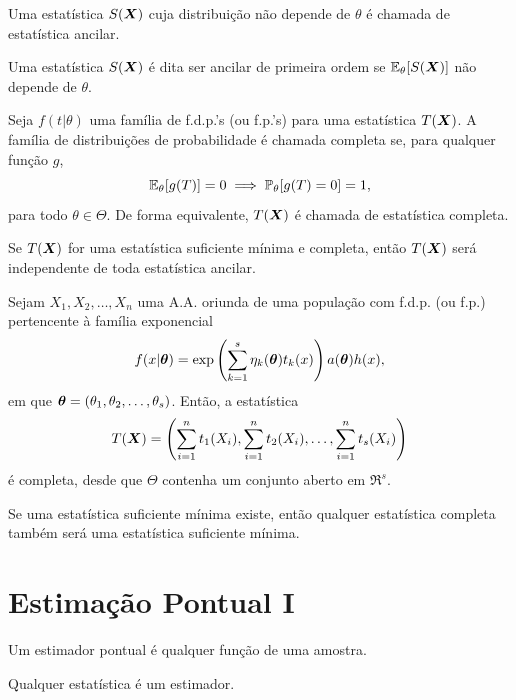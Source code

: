 \begin{definition}
	Uma estatística $S(\bm{X})$ cuja distribuição não depende de $\theta$ é chamada de estatística ancilar.
	
	\begin{note}
		Uma estatística $S(\bm{X})$ é dita ser ancilar de primeira ordem se $\operatorname{\mathbb{E}}_\theta[S(\bm{X})]$ não depende de $\theta$.
	\end{note}
\end{definition}

\begin{definition}
	Seja $f(t | \theta)$ uma família de f.d.p.'s (ou f.p.'s) para uma estatística $T(\bm{X})$. A família de distribuições de probabilidade é chamada completa se, para qualquer função $g$,
	\[
	\operatorname{\mathbb{E}}_\theta[g(T)] = 0 \implies \mathbb{P}_\theta[g(T) = 0] = 1,
	\]
	para todo $\theta \in \Theta$. De forma equivalente, $T(\bm{X})$ é chamada de estatística completa.
\end{definition}

\begin{theorem}[Basu]
	Se $T(\bm{X})$ for uma estatística suficiente mínima e completa, então $T(\bm{X})$ será independente de toda estatística ancilar.
\end{theorem}

\begin{theorem}
	Sejam $X_1, X_2, \ldots, X_n$ uma A.A. oriunda de uma população com f.d.p. (ou f.p.) pertencente à família exponencial
	\[
		f(x | \bm{\theta}) = \exp\left(\sum_{k=1}^{s} \eta_k(\bm{\theta})t_k(x)\right) a(\bm{\theta})h(x),
	\]
	em que $\bm{\theta} = (\theta_1, \theta_2, \ldots, \theta_s)$. Então, a estatística
	\[
		T(\bm{X}) = \left(\sum_{i=1}^{n} t_1(X_i), \sum_{i=1}^{n} t_2(X_i), \ldots, \sum_{i=1}^{n} t_s(X_i)\right)
	\]
	é completa, desde que $\Theta$ contenha um conjunto aberto em $\Re^s$.
\end{theorem}

\begin{theorem}
	Se uma estatística suficiente mínima existe, então qualquer estatística completa também será uma estatística suficiente mínima.
\end{theorem}

\section{Estimação Pontual I}

\begin{definition}
	Um estimador pontual é qualquer função de uma amostra.
	
	\begin{note}
		Qualquer estatística é um estimador.
	\end{note}
\end{definition}

